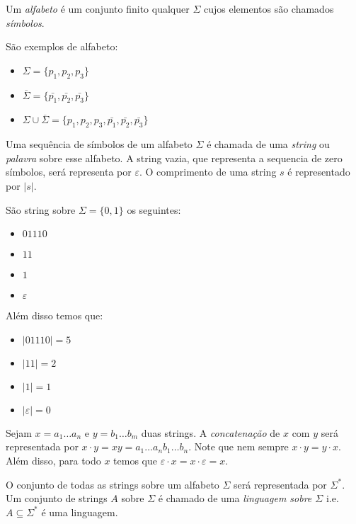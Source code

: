 Um {\em alfabeto} é um conjunto finito qualquer $\Sigma$ cujos elementos são chamados {\em símbolos}.


\begin{example}
  São exemplos de alfabeto:
\begin{itemize}
\item[] $\Sigma = \{p_1, p_2, p_3\}$
\item[] $\overline{\Sigma} = \{\bar{p_1}, \bar{p_2}, \bar{p_3}\}$
\item[] $\Sigma \cup \overline{\Sigma} = \{p_1, p_2, p_3, \bar{p_1}, \bar{p_2}, \bar{p_3}\}$
\end{itemize}

\end{example}

Uma sequência de símbolos de um alfabeto $\Sigma$ é chamada de uma {\em string} ou {\em palavra} sobre esse alfabeto.
A string vazia, que representa a sequencia de zero símbolos, será representa por $\varepsilon$.
O comprimento de uma string $s$ é representado por $|s|$.

\begin{example}
  São string sobre $\Sigma = \{0,1\}$ os seguintes:
\begin{itemize}
\item[] $01110$
\item[] $11$
\item[] $1$
\item[] $\varepsilon$ 
\end{itemize}

Além disso temos que:
\begin{itemize}
\item[] $|01110| = 5$
\item[] $|11| = 2$
\item[] $|1| = 1$
\item[] $|\varepsilon| = 0$ 
\end{itemize}
\end{example}

Sejam $x = a_1 \dots a_n$ e $y = b_1 \dots b_m$ duas strings.
A {\em concatenação} de $x$ com $y$ será representada por $x \cdot y = xy = a_1\dots a_n b_1 \dots b_n$.
Note que nem sempre $x \cdot y = y \cdot x$.
Além disso, para todo $x$ temos que $\varepsilon \cdot x = x \cdot \varepsilon = x$.

O conjunto de todas as strings sobre um alfabeto $\Sigma$ será representada por $\Sigma^*$.
Um conjunto de strings $A$ sobre $\Sigma$ é chamado de uma {\em linguagem sobre $\Sigma$} i.e. $A \subseteq \Sigma^*$ é uma linguagem.


